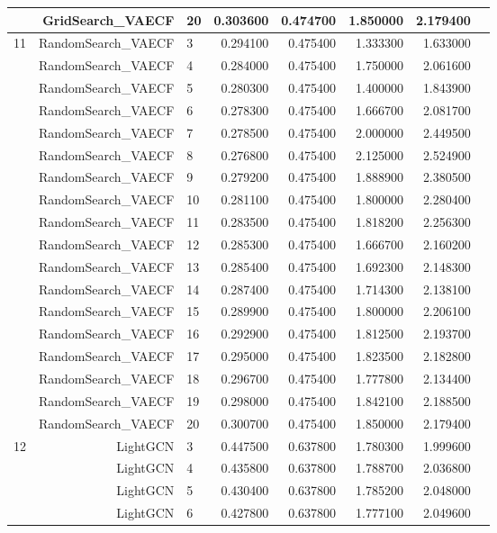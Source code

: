 \documentclass[a4paper,12pt]{article}
\begin{document}
\begin{center}
\begin{longtable}{lrlrrrrr}
& GridSearch\_VAECF & 20 & 0.303600 & 0.474700 & 1.850000 & 2.179400 \\ \hline
\multirow{18}{1cm}{11} & RandomSearch\_VAECF & 3 & 0.294100 & 0.475400 & 1.333300 & 1.633000 \\
& RandomSearch\_VAECF & 4 & 0.284000 & 0.475400 & 1.750000 & 2.061600 \\
& RandomSearch\_VAECF & 5 & 0.280300 & 0.475400 & 1.400000 & 1.843900 \\
& RandomSearch\_VAECF & 6 & 0.278300 & 0.475400 & 1.666700 & 2.081700 \\
& RandomSearch\_VAECF & 7 & 0.278500 & 0.475400 & 2.000000 & 2.449500 \\
& RandomSearch\_VAECF & 8 & 0.276800 & 0.475400 & 2.125000 & 2.524900 \\
& RandomSearch\_VAECF & 9 & 0.279200 & 0.475400 & 1.888900 & 2.380500 \\
& RandomSearch\_VAECF & 10 & 0.281100 & 0.475400 & 1.800000 & 2.280400 \\
& RandomSearch\_VAECF & 11 & 0.283500 & 0.475400 & 1.818200 & 2.256300 \\
& RandomSearch\_VAECF & 12 & 0.285300 & 0.475400 & 1.666700 & 2.160200 \\
& RandomSearch\_VAECF & 13 & 0.285400 & 0.475400 & 1.692300 & 2.148300 \\
& RandomSearch\_VAECF & 14 & 0.287400 & 0.475400 & 1.714300 & 2.138100 \\
& RandomSearch\_VAECF & 15 & 0.289900 & 0.475400 & 1.800000 & 2.206100 \\
& RandomSearch\_VAECF & 16 & 0.292900 & 0.475400 & 1.812500 & 2.193700 \\
& RandomSearch\_VAECF & 17 & 0.295000 & 0.475400 & 1.823500 & 2.182800 \\
& RandomSearch\_VAECF & 18 & 0.296700 & 0.475400 & 1.777800 & 2.134400 \\
& RandomSearch\_VAECF & 19 & 0.298000 & 0.475400 & 1.842100 & 2.188500 \\
& RandomSearch\_VAECF & 20 & 0.300700 & 0.475400 & 1.850000 & 2.179400 \\ \hline
\multirow{18}{1cm}{12} & LightGCN & 3 & 0.447500 & 0.637800 & 1.780300 & 1.999600 \\
& LightGCN & 4 & 0.435800 & 0.637800 & 1.788700 & 2.036800 \\
& LightGCN & 5 & 0.430400 & 0.637800 & 1.785200 & 2.048000 \\
& LightGCN & 6 & 0.427800 & 0.637800 & 1.777100 & 2.049600 \\

\end{longtable}
\end{center}
\end{document}
